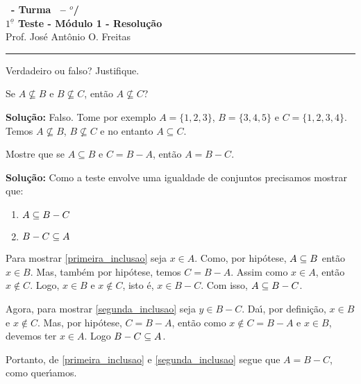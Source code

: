 \documentclass[12pt]{exam}
\begin{document}
\begin{center}
{\Large\bf \disciplina\ - Turma \turma\ -- \semestre$^{o}$/\ano} \\ \vspace{9pt} {\large\bf
$1^{\underline{o}}$ Teste - M\'odulo 1 - Resolu\c{c}\~ao}\\
\vspace{9pt} Prof. Jos{\'e} Ant{\^o}nio O. Freitas
\end{center}
\hrule

\vspace{.6cm}


\vspace{.6cm}

\questao Verdadeiro ou falso? Justifique.
\begin{center}
    Se $A \nsubseteq B$ e $B \nsubseteq C$, ent\~ao $A \nsubseteq C$?
\end{center}

\noindent\textbf{Solu\c{c}\~ao:} Falso. Tome por exemplo $A = \{1, 2, 3\}$, $B = \{3, 4, 5\}$ e $C = \{1, 2, 3, 4\}$. Temos $A \nsubseteq B$, $B \nsubseteq C$ e no entanto $A \subseteq C$.

\vspace{.5cm}

\questao Mostre que se $A \subseteq B$ e $C = B - A$, ent\~ao $A = B - C$.

\noindent\textbf{Solu\c{c}\~ao:} Como a teste envolve uma igualdade de conjuntos precisamos mostrar que:
\begin{enumerate}[label=({\roman*})]
    \item $A \subseteq B - C$\label{primeira_inclusao}
    \item $B - C \subseteq A$\label{segunda_inclusao}
\end{enumerate}

Para mostrar \ref{primeira_inclusao} seja $x \in A$. Como, por hip\'otese, $A \subseteq B$ ent\~ao $x \in B$. Mas, tamb\'em por hip\'otese, temos $C = B - A$. Assim como $x \in A$, ent\~ao $x \notin C$. Logo, $x \in B$ e $x \notin C$, isto \'e, $x \in B - C$. Com isso, $A \subseteq B - C$.

Agora, para mostrar \ref{segunda_inclusao} seja $y \in B - C$. Da{\'\i}, por defini\c{c}\~ao, $x \in B$ e $x \notin C$. Mas, por hip\'otese, $C = B - A$, ent\~ao como $x \notin C = B - A$ e $x \in B$, devemos ter $x \in A$. Logo $B - C \subseteq A$.

Portanto, de \ref{primeira_inclusao} e \ref{segunda_inclusao} segue que $A = B - C$, como quer{\'\i}amos.
\end{document}
